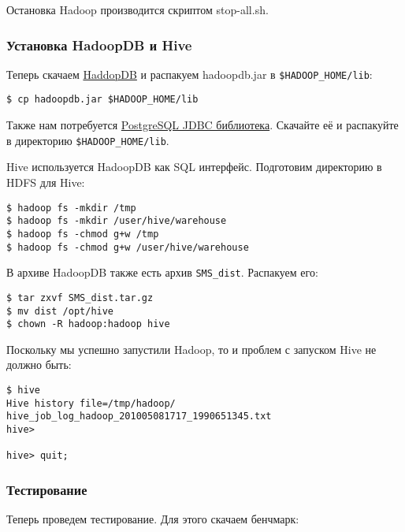 Остановка Hadoop производится скриптом stop-all.sh.

\subsubsection{Установка HadoopDB и Hive}

Теперь скачаем \href{http://sourceforge.net/projects/hadoopdb/files/}{HaddopDB} и распакуем hadoopdb.jar в \lstinline!$HADOOP_HOME/lib!:

\begin{lstlisting}[label=lst:haddop15,caption=Установка HadoopDB]
$ cp hadoopdb.jar $HADOOP_HOME/lib
\end{lstlisting}

Также нам потребуется \href{http://jdbc.postgresql.org/download.html}{PostgreSQL JDBC библиотека}. Скачайте её и распакуйте в директорию \lstinline!$HADOOP_HOME/lib!.

Hive используется HadoopDB как SQL интерфейс. Подготовим директорию в HDFS для Hive:

\begin{lstlisting}[label=lst:haddop16,caption=Установка HadoopDB]
$ hadoop fs -mkdir /tmp
$ hadoop fs -mkdir /user/hive/warehouse
$ hadoop fs -chmod g+w /tmp
$ hadoop fs -chmod g+w /user/hive/warehouse
\end{lstlisting}

В архиве HadoopDB также есть архив \lstinline!SMS_dist!. Распакуем его:

\begin{lstlisting}[label=lst:haddop17,caption=Установка HadoopDB]
$ tar zxvf SMS_dist.tar.gz
$ mv dist /opt/hive
$ chown -R hadoop:hadoop hive
\end{lstlisting}

Поскольку мы успешно запустили Hadoop, то и проблем с запуском Hive не должно быть:

\begin{lstlisting}[label=lst:haddop18,caption=Установка HadoopDB]
$ hive
Hive history file=/tmp/hadoop/
hive_job_log_hadoop_201005081717_1990651345.txt
hive>

hive> quit;
\end{lstlisting}

\subsubsection{Тестирование}

Теперь проведем тестирование. Для этого скачаем бенчмарк:

